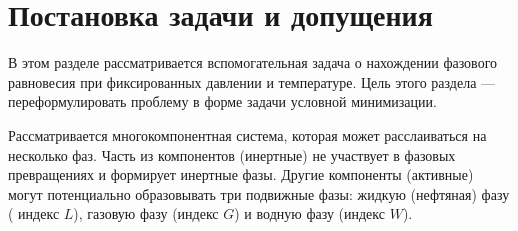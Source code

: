 \documentclass[12pt]{article}
\newcommand{\pd}[2]{\frac{\partial #1}{\partial #2}}
\newtheorem{note}{Примечание}[section]
\begin{document}
%
%
%
%
%
%
%
%
%

\section{Постановка задачи и допущения}

В этом разделе рассматривается вспомогательная задача о нахождении фазового равновесия при фиксированных давлении и температуре. Цель этого раздела --- переформулировать проблему в форме задачи условной минимизации.

Рассматривается многокомпонентная система, которая может расслаиваться на несколько фаз. Часть из компонентов (инертные) не участвует в фазовых превращениях и формирует инертные фазы. Другие компоненты (активные) могут потенциально образовывать три подвижные фазы: жидкую (нефтяная) фазу ( индекс $L$), газовую фазу (индекс $G$) и водную фазу (индекс $W$).
\end{document}
